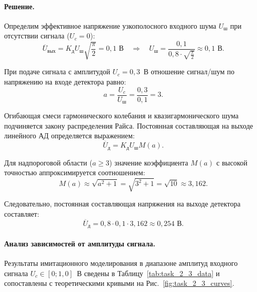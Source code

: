 \paragraph{Решение.}
Определим эффективное напряжение узкополосного входного шума $U_{\text{ш}}$ при отсутствии сигнала ($U_c = 0$):
\begin{equation}
    \overline{U}_{\text{вых}} = K_{\text{д}} U_{\text{ш}} \sqrt{\frac{\pi}{2}} = 0{,}1\text{ В} \quad \Longrightarrow \quad U_{\text{ш}} = \frac{0{,}1}{0{,}8 \cdot \sqrt{\frac{\pi}{2}}} \approx 0{,}1\text{ В}.
\end{equation}

При подаче сигнала с амплитудой $U_c = 0{,}3$~В отношение сигнал/шум по напряжению на входе детектора равно:
\begin{equation}
    a = \frac{U_c}{U_{\text{ш}}} = \frac{0{,}3}{0{,}1} = 3.
\end{equation}

Огибающая смеси гармонического колебания и квазигармонического шума подчиняется закону распределения Райса. Постоянная составляющая на выходе линейного АД определяется выражением:
\begin{equation}
    \overline{U}_{\text{д}} = K_{\text{д}} U_{\text{ш}} M(a).
\end{equation}

Для надпороговой области ($a \ge 3$) значение коэффициента $M(a)$ с высокой точностью аппроксимируется соотношением:
\begin{equation}
    M(a) \approx \sqrt{a^2 + 1} = \sqrt{3^2 + 1} = \sqrt{10} \approx 3{,}162.
\end{equation}

Следовательно, постоянная составляющая напряжения на выходе детектора составляет:
\begin{equation}
    \overline{U}_{\text{д}} = 0{,}8 \cdot 0{,}1 \cdot 3{,}162 \approx 0{,}254\text{ В}.
\end{equation}

\paragraph{Анализ зависимостей от амплитуды сигнала.}
Результаты имитационного моделирования в диапазоне амплитуд входного сигнала $U_c \in [0; 1{,}0]$~В сведены в Таблицу~\ref{tab:task_2_3_data} и сопоставлены с теоретическими кривыми на Рис.~\ref{fig:task_2_3_curves}.


